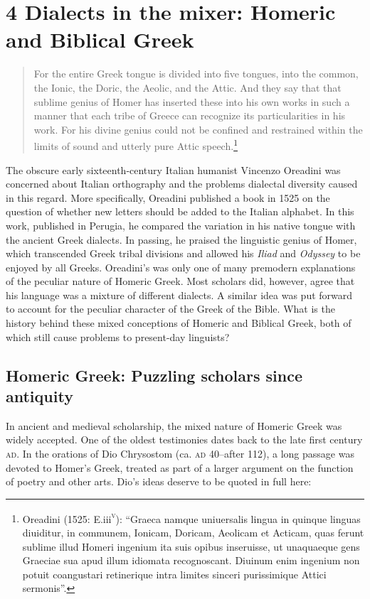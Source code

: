 \documentclass[output=paper]{langsci/langscibook}
\begin{document}
\section{\textsc{4} Dialects in the mixer: Homeric and Biblical Greek}
\hypertarget{Toc19704826}{}\begin{quote}
For the entire Greek tongue is divided into five tongues, into the common, the Ionic, the Doric, the Aeolic, and the Attic. And they say that that sublime genius of Homer has inserted these into his own works in such a manner that each tribe of Greece can recognize its particularities in his work. For his divine genius could not be confined and restrained within the limits of sound and utterly pure Attic speech.\footnote{Oreadini (1525: E.iii\textsc{\textsuperscript{v}}): “Graeca namque uniuersalis lingua in quinque linguas diuiditur, in communem, Ionicam, Doricam, Aeolicam et Acticam, quas ferunt sublime illud Homeri ingenium ita suis opibus inseruisse, ut unaquaeque gens Graeciae sua apud illum idiomata recognoscant. Diuinum enim ingenium non potuit coangustari retinerique intra limites sinceri purissimique Attici sermonis”.}
\end{quote}

The obscure early sixteenth-century Italian humanist Vincenzo Oreadini was concerned about Italian orthography and the problems dialectal diversity caused in this regard. More specifically, Oreadini published a book in 1525 on the question of whether new letters should be added to the Italian alphabet. In this work, published in Perugia, he compared the variation in his native tongue with the ancient Greek dialects. In passing, he praised the linguistic genius of Homer, which transcended Greek tribal divisions and allowed his \textit{Iliad} and \textit{Odyssey} to be enjoyed by all Greeks. Oreadini’s was only one of many premodern explanations of the peculiar nature of Homeric Greek. Most scholars did, however, agree that his language was a mixture of different dialects. A similar idea was put forward to account for the peculiar character of the Greek of the Bible. What is the history behind these mixed conceptions of Homeric and Biblical Greek, both of which still cause problems to present-day linguists?

\subsection{Homeric Greek: Puzzling scholars since antiquity}
\hypertarget{Toc19704827}{}
In ancient and medieval scholarship, the mixed nature of Homeric Greek was widely accepted. One of the oldest testimonies dates back to the late first century \textsc{ad}. In the orations of Dio Chrysostom (ca. \textsc{ad} 40–after 112), a long passage was devoted to Homer’s Greek, treated as part of a larger argument on the function of poetry and other arts. Dio’s ideas deserve to be quoted in full here:
\end{document}
